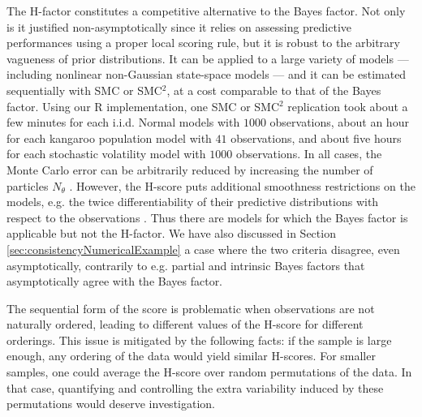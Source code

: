 \documentclass[12pt]{article}
\theoremstyle{plain}
\theoremstyle{definition}
\begin{document}
	The H-factor constitutes a competitive alternative to the Bayes factor. 
	Not only is it justified non-asymptotically since it relies on assessing predictive performances using a proper local scoring rule, but it is robust to the arbitrary vagueness
	of prior distributions. It can be applied to a large variety of
	models --- including nonlinear non-Gaussian state-space models --- and
	it can be estimated sequentially with SMC or SMC$^2$, at a cost comparable to
	that of the Bayes factor. Using our R implementation, one SMC or SMC$^2$ replication took about a few minutes for each i.i.d.\! Normal models with $1000$ observations, about an hour for each kangaroo population model with $41$ observations, and about five hours for each stochastic volatility model with $1000$ observations. In all cases, the Monte Carlo error can be arbitrarily reduced
	by increasing the number of particles $N_\theta$ \citep[Section 3 in][]{chopin:jacob:papaspiliopoulos2013}. However, the H-score puts
	additional smoothness restrictions on the models, e.g.\! the twice
	differentiability of their predictive distributions with respect to the
	observations \citep[see][and its rejoinder]{dawid2015}. Thus there are 
	models for which the Bayes factor is applicable but not the H-factor. 
	We have also discussed in Section \ref{sec:consistencyNumericalExample} a case
	where the two criteria disagree, even asymptotically, contrarily to
	e.g. partial and intrinsic Bayes factors \citep{santis1999methods}
	that asymptotically agree with the Bayes factor.
	
	The sequential form of the score is problematic when observations are not naturally ordered, leading to different values
	of the H-score for different orderings. This issue is mitigated by the
	following facts: if the sample is large enough, any ordering of the data would yield similar H-scores.
	For smaller samples, one could average the H-score over
	random permutations of the data. In that case, quantifying and controlling the extra
	variability induced by these permutations would deserve investigation. 
	
\end{document}
